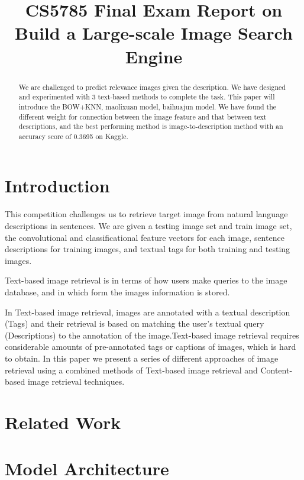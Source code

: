 \documentclass{article}
\title{CS5785 Final Exam Report on Build a Large-scale Image Search Engine}
\author{
}
\begin{document}

\maketitle

\begin{abstract}
  
  We are challenged to predict relevance images given the description. We have designed and experimented with 3 text-based methods to complete the task. This paper will introduce the  BOW+KNN, maolixuan model, baihuajun model. We have found the different weight for connection between the image feature and that between text descriptions, and the best performing method is image-to-description method with an accuracy score of 0.3695 on Kaggle.
\end{abstract}

\section{Introduction}

This competition challenges us to retrieve target image from natural language descriptions in sentences. We are given a testing image set and train image set, the convolutional and classificational feature vectors for each image, sentence descriptions for training images, and textual tags for both training and testing images.

Text-based image retrieval is in terms of how users make queries to the image database, and in which form the images information is stored.

In Text-based image retrieval, images are annotated with a textual description (Tags) and their retrieval is based on matching the user’s textual query (Descriptions) to the annotation of the image.Text-based image retrieval requires considerable amounts of pre-annotated tags or captions of images, which is hard to obtain. In this paper we present a series of different approaches of image retrieval using a combined methods of Text-based image retrieval and Content-based image retrieval techniques.

\section{Related Work}

\section{Model Architecture}
\end{document}
